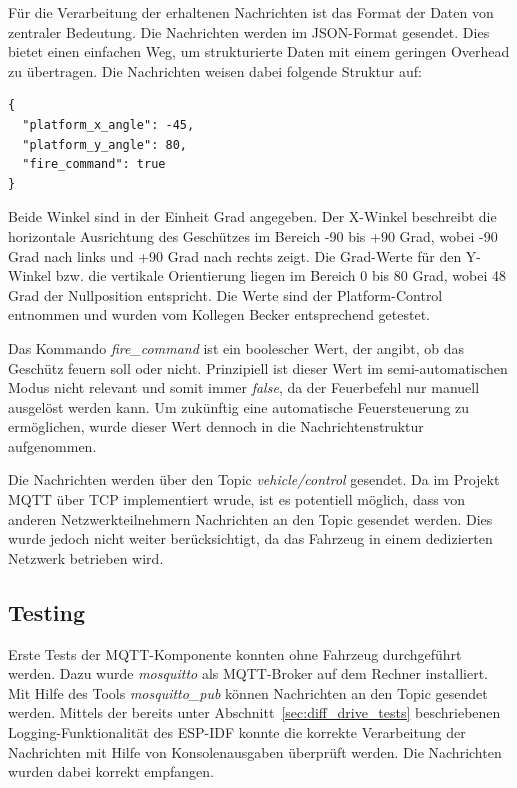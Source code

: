 Für die Verarbeitung der erhaltenen Nachrichten ist das Format der Daten von zentraler Bedeutung. Die Nachrichten werden im JSON-Format gesendet. Dies bietet einen einfachen Weg, um strukturierte Daten mit einem geringen Overhead zu übertragen. Die Nachrichten weisen dabei folgende Struktur auf:

\begin{lstlisting}
{
  "platform_x_angle": -45,
  "platform_y_angle": 80,
  "fire_command": true
}
\end{lstlisting}

Beide Winkel sind in der Einheit Grad angegeben. Der X-Winkel beschreibt die horizontale Ausrichtung des Geschützes im Bereich -90 bis +90 Grad, wobei -90 Grad nach links und +90 Grad nach rechts zeigt. Die Grad-Werte für den Y-Winkel bzw. die vertikale Orientierung liegen im Bereich 0 bis 80 Grad, wobei 48 Grad der Nullposition entspricht. Die Werte sind der Platform-Control entnommen und wurden vom Kollegen Becker entsprechend getestet. \newline

Das Kommando \textit{fire\_command} ist ein boolescher Wert, der angibt, ob das Geschütz feuern soll oder nicht. Prinzipiell ist dieser Wert im semi-automatischen Modus nicht relevant und somit immer \textit{false}, da der Feuerbefehl nur manuell ausgelöst werden kann. Um zukünftig eine automatische Feuersteuerung zu ermöglichen, wurde dieser Wert dennoch in die Nachrichtenstruktur aufgenommen. \newline

Die Nachrichten werden über den Topic \textit{vehicle/control} gesendet. Da im Projekt MQTT über TCP implementiert wrude, ist es potentiell möglich, dass von anderen Netzwerkteilnehmern Nachrichten an den Topic gesendet werden. Dies wurde jedoch nicht weiter berücksichtigt, da das Fahrzeug in einem dedizierten Netzwerk betrieben wird. \newline

\subsection{Testing}

Erste Tests der MQTT-Komponente konnten ohne Fahrzeug durchgeführt werden. Dazu wurde \textit{mosquitto} als MQTT-Broker auf dem Rechner installiert. Mit Hilfe des Tools \textit{mosquitto\_pub} können Nachrichten an den Topic gesendet werden. Mittels der bereits unter Abschnitt~\ref{sec:diff_drive_tests} beschriebenen Logging-Funktionalität des ESP-IDF konnte die korrekte Verarbeitung der Nachrichten mit Hilfe von Konsolenausgaben überprüft werden. Die Nachrichten wurden dabei korrekt empfangen.

